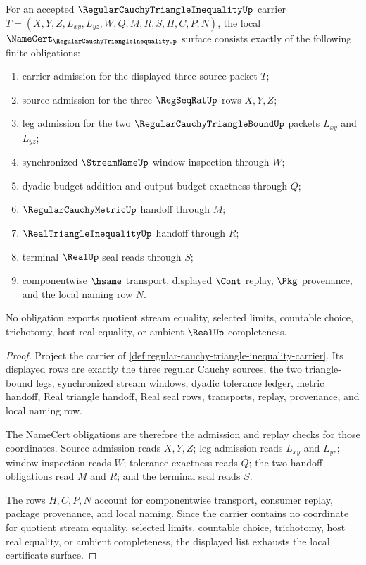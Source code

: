 \begin{theorem}
\label{thm:regular-cauchy-triangle-inequality-obligations}
For an accepted $\RegularCauchyTriangleInequalityUp$ carrier $T=(X,Y,Z,L_{xy},L_{yz},W,Q,M,R,S,H,C,P,N)$, the local $\NameCert_{\RegularCauchyTriangleInequalityUp}$ surface consists exactly of the following finite obligations:
\begin{enumerate}
\item carrier admission for the displayed three-source packet $T$;
\item source admission for the three $\RegSeqRatUp$ rows $X,Y,Z$;
\item leg admission for the two $\RegularCauchyTriangleBoundUp$ packets $L_{xy}$ and $L_{yz}$;
\item synchronized $\StreamNameUp$ window inspection through $W$;
\item dyadic budget addition and output-budget exactness through $Q$;
\item $\RegularCauchyMetricUp$ handoff through $M$;
\item $\RealTriangleInequalityUp$ handoff through $R$;
\item terminal $\RealUp$ seal reads through $S$;
\item componentwise $\hsame$ transport, displayed $\Cont$ replay, $\Pkg$ provenance, and the local naming row $N$.
\end{enumerate}
No obligation exports quotient stream equality, selected limits, countable choice, trichotomy, host real equality, or ambient $\RealUp$ completeness.
\end{theorem}
\begin{proof}
Project the carrier of \autoref{def:regular-cauchy-triangle-inequality-carrier}. Its displayed rows are exactly the three regular Cauchy sources, the two triangle-bound legs, synchronized stream windows, dyadic tolerance ledger, metric handoff, Real triangle handoff, Real seal rows, transports, replay, provenance, and local naming row.

The NameCert obligations are therefore the admission and replay checks for those coordinates. Source admission reads $X,Y,Z$; leg admission reads $L_{xy}$ and $L_{yz}$; window inspection reads $W$; tolerance exactness reads $Q$; the two handoff obligations read $M$ and $R$; and the terminal seal reads $S$.

The rows $H,C,P,N$ account for componentwise transport, consumer replay, package provenance, and local naming. Since the carrier contains no coordinate for quotient stream equality, selected limits, countable choice, trichotomy, host real equality, or ambient completeness, the displayed list exhausts the local certificate surface.
\end{proof}

